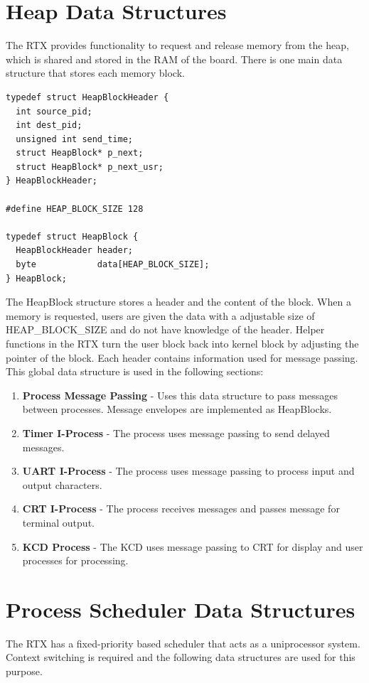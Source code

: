 \documentclass[12pt]{report}
\begin{document}
\section{Heap Data Structures}
The RTX provides functionality to request and release memory from the heap, which is shared and stored in the RAM of the board. There is one main data structure that stores each memory block.

\begin{lstlisting}
typedef struct HeapBlockHeader {
  int source_pid;
  int dest_pid;
  unsigned int send_time;
  struct HeapBlock* p_next;
  struct HeapBlock* p_next_usr;
} HeapBlockHeader;

#define HEAP_BLOCK_SIZE 128

typedef struct HeapBlock {
  HeapBlockHeader header;
  byte            data[HEAP_BLOCK_SIZE];
} HeapBlock;

\end{lstlisting}

The HeapBlock structure stores a header and the content of the block. When a memory is requested, users are given the data with a adjustable size of HEAP\_BLOCK\_SIZE and do not have knowledge of the header. Helper functions in the RTX turn the user block back into kernel block by adjusting the pointer of the block. Each header contains information used for message passing. This global data structure is used in the following sections:
\begin{enumerate}
    \item {\bf Process Message Passing} - Uses this data structure to pass messages between processes. Message envelopes are implemented as HeapBlocks.
    \item {\bf Timer I-Process} - The process uses message passing to send delayed messages.
    \item {\bf UART I-Process} - The process uses message passing to process input and output characters.
    \item {\bf CRT I-Process} - The process receives messages and passes message for terminal output.
    \item {\bf KCD Process} - The KCD uses message passing to CRT for display and user processes for processing.
\end{enumerate}


\section{Process Scheduler Data Structures}
The RTX has a fixed-priority based scheduler that acts as a uniprocessor system. Context switching is required and the following data structures are used for this purpose.
\end{document}
